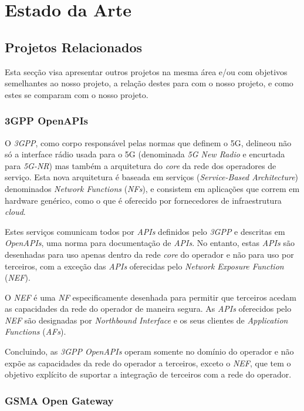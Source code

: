 \chapter{Estado da Arte}

\section{Projetos Relacionados}

Esta secção visa apresentar outros projetos na mesma área e/ou com objetivos
semelhantes ao nosso projeto, a relação destes para com o nosso projeto, e como
estes se comparam com o nosso projeto.

\subsection{3GPP OpenAPIs}\label{sec:related_work_3gpp}

O \emph{3GPP}, como corpo responsável pelas normas que definem o 5G, delineou
não só a interface rádio usada para o 5G (denominada \emph{5G New Radio} e
encurtada para \emph{5G-NR}) mas também a arquitetura do \emph{core} da rede
dos operadores de serviço. Esta nova arquitetura é baseada em serviços
(\emph{Service-Based Architecture}) denominados \emph{Network Functions}
(\emph{NFs}), e consistem em aplicações que correm em hardware genérico, como o
que é oferecido por fornecedores de infraestrutura \emph{cloud}.

Estes serviços comunicam todos por \emph{APIs} definidos pelo \emph{3GPP} e
descritas em \emph{OpenAPIs}, uma norma para documentação de \emph{APIs}. No
entanto, estas \emph{APIs} são desenhadas para uso apenas dentro da rede
\emph{core} do operador e não para uso por terceiros, com a exceção das
\emph{APIs} oferecidas pelo \emph{Network Exposure Function} (\emph{NEF}).

O \emph{NEF} é uma \emph{NF} especificamente desenhada para permitir que
terceiros acedam as capacidades da rede do operador de maneira segura. As
\emph{APIs} oferecidos pelo \emph{NEF} são designadas por \emph{Northbound
	Interface} e os seus clientes de \emph{Application Functions} (\emph{AFs}).


Concluindo, as \emph{3GPP OpenAPIs} operam somente no domínio do operador e não
expõe as capacidades da rede do operador a terceiros, exceto o \emph{NEF}, que
tem o objetivo explícito de suportar a integração de terceiros com a rede do
operador.

\subsection{GSMA Open Gateway}

